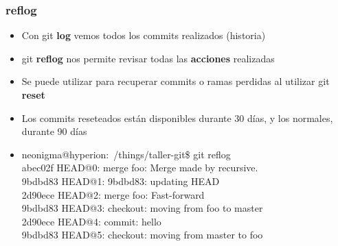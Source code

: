 \frame
{
\frametitle{reflog}
 \begin{itemize}
  \item Con git \textbf{log} vemos todos los commits realizados (historia)
  \item git \textbf{reflog} nos permite revisar todas las \textbf{acciones} realizadas
  \item Se puede utilizar para recuperar commits o ramas perdidas al utilizar git \textbf{reset}
  \item Los commits reseteados están disponibles durante 30 días, y los normales, durante 90 días
  \item[] \footnotesize 
	neonigma@hyperion:~/things/taller-git\$ git reflog\\
	abec02f HEAD@{0}: merge foo: Merge made by recursive.\\
	9bdbd83 HEAD@{1}: 9bdbd83: updating HEAD\\
	2d90ece HEAD@{2}: merge foo: Fast-forward\\
	9bdbd83 HEAD@{3}: checkout: moving from foo to master\\
	2d90ece HEAD@{4}: commit: hello\\
	9bdbd83 HEAD@{5}: checkout: moving from master to foo
\end{itemize}
}

